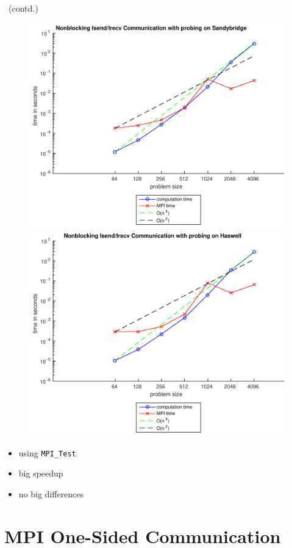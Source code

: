 \documentclass[9pt,pdftex]{beamer}
\begin{document}
\begin{frame}{\insertsubsection \ (contd.)}
\begin{figure}
\includegraphics[width=.5\textwidth]{Pictures/Task4SBprobe}
\hfill
\includegraphics[width=.5\textwidth]{Pictures/Task4HWprobe}
\end{figure}
\begin{itemize}
\item using \lstinline{MPI_Test}
\item big speedup
\item no big differences
\end{itemize}
\end{frame}

\section{MPI One-Sided Communication}
\begin{frame}{\phantom{Contents}}
\tableofcontents[
  currentsection  
]
\end{frame}
\end{document}
